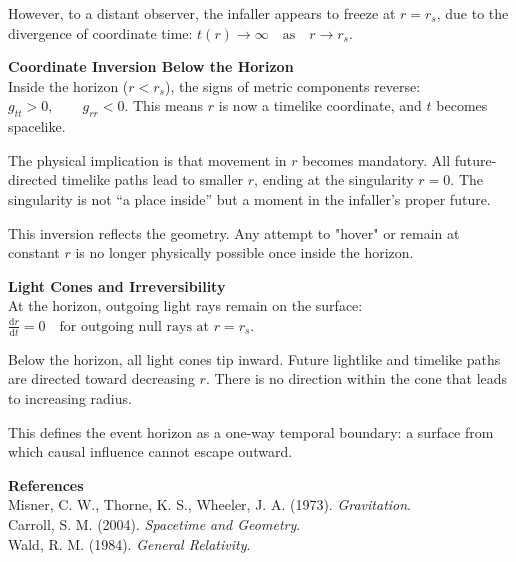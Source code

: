 \begin{technical}
However, to a distant observer, the infaller appears to freeze at \(r = r_s\), due to the divergence of coordinate time: $
t(r) \to \infty \quad \text{as} \quad r \to r_s$.

\vspace{0.3m}
\noindent\textbf{Coordinate Inversion Below the Horizon}\\[0.5em]
Inside the horizon (\(r < r_s\)), the signs of metric components reverse: $g_{tt} > 0, \qquad g_{rr} < 0$.
This means \(r\) is now a timelike coordinate, and \(t\) becomes spacelike.

The physical implication is that movement in \(r\) becomes mandatory. All future-directed timelike paths lead to smaller \(r\), ending at the singularity \(r = 0\). The singularity is not “a place inside” but a moment in the infaller’s proper future.

This inversion  reflects the geometry. Any attempt to "hover" or remain at constant \(r\) is no longer physically possible once inside the horizon.

\vspace{0.3em}
\noindent\textbf{Light Cones and Irreversibility}\\[0.5em]
At the horizon, outgoing light rays remain on the surface: $\frac{\mathrm{d}r}{\mathrm{d}t} = 0 \quad \text{for outgoing null rays at } r = r_s$.

Below the horizon, all light cones tip inward. Future lightlike and timelike paths are directed toward decreasing \(r\). There is no direction within the cone that leads to increasing radius.

This defines the event horizon as a one-way temporal boundary: a surface from which causal influence cannot escape outward.

\vspace{0.7em}
\noindent\textbf{References}\\
Misner, C. W., Thorne, K. S., Wheeler, J. A. (1973). \textit{Gravitation}.\\
Carroll, S. M. (2004). \textit{Spacetime and Geometry}.\\
Wald, R. M. (1984). \textit{General Relativity}.
\end{technical}
